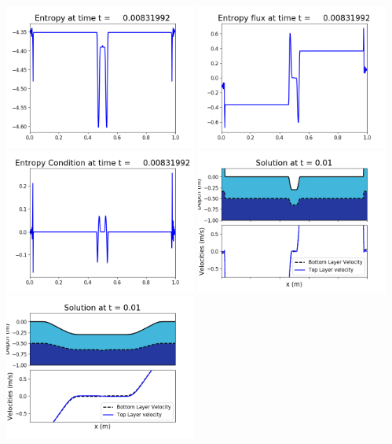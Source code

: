 \documentclass[11pt]{article}
\begin{document}
\vskip 10pt 
\includegraphics[width=0.475\textwidth]{frame0020fig1007.png}
\includegraphics[width=0.475\textwidth]{frame0020fig1008.png}
\vskip 10pt 
\includegraphics[width=0.475\textwidth]{frame0020fig1009.png}
\vskip 10pt 
\includegraphics[width=0.475\textwidth]{frame0021fig1001.png}
\includegraphics[width=0.475\textwidth]{frame0021fig1002.png}
\end{document}

